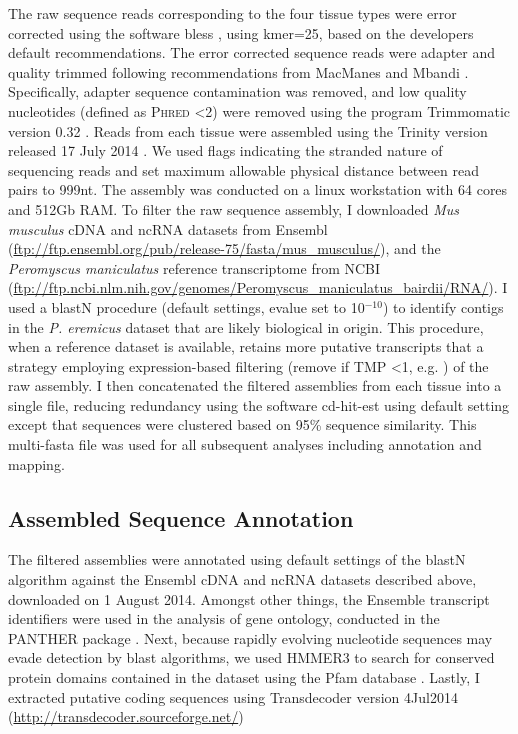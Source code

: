 \documentclass[11pt]{article}
\begin{document}
The raw sequence reads corresponding to the four tissue types were error corrected using the software bless \cite{Heo:2014cb}, using kmer=25, based on the developers default recommendations. The error corrected sequence reads were adapter and quality trimmed following recommendations from MacManes \cite{MacManes:2014io} and Mbandi \cite{Christoffels:2014bg}. Specifically, adapter sequence contamination was removed, and low quality nucleotides (defined as \textsc{Phred} \textless 2) were removed using the program Trimmomatic version 0.32  \cite{Lohse:2012fg}. Reads from each tissue were assembled using the Trinity version released 17 July 2014 \cite{Haas:2013jq}. We used flags indicating the stranded nature of sequencing reads and set maximum allowable physical distance between read pairs to 999nt. The assembly was conducted on a linux workstation with 64 cores and 512Gb RAM. To filter the raw sequence assembly, I downloaded \textit{Mus musculus} cDNA and ncRNA datasets from Ensembl (\url{ftp://ftp.ensembl.org/pub/release-75/fasta/mus_musculus/}), and the \textit{Peromyscus maniculatus} reference transcriptome from NCBI (\url{ftp://ftp.ncbi.nlm.nih.gov/genomes/Peromyscus_maniculatus_bairdii/RNA/}). I used a blastN procedure (default settings, evalue set to 10$^{-10}$) to identify contigs in the \textit{P. eremicus} dataset that are likely biological in origin. This procedure, when a reference dataset is available, retains more putative transcripts that a strategy employing expression-based filtering (remove if TMP \textless 1, e.g. \cite{MacManes:2012bu}) of the raw assembly. I then concatenated the filtered assemblies from each tissue into a single file, reducing redundancy using the software cd-hit-est \cite{Li:2006hr} using default setting except that sequences were clustered based on 95\% sequence similarity. This multi-fasta file was used for all subsequent analyses including annotation and mapping. \\

\subsection*{Assembled Sequence Annotation}



The filtered assemblies were annotated using default settings of the blastN algorithm \cite{Camacho:2009fc} against the Ensembl cDNA and ncRNA datasets described above, downloaded on 1 August 2014. Amongst other things, the Ensemble transcript identifiers were used in the analysis of gene ontology, conducted in the PANTHER package \cite{Mi:2004iv}. Next, because rapidly evolving nucleotide sequences may evade detection by blast algorithms, we used HMMER3 \cite{Wheeler:2013gj} to search for conserved protein domains contained in the dataset using the Pfam database \cite{Punta:2012ko}. Lastly, I extracted putative coding sequences using Transdecoder version 4Jul2014 (\url{http://transdecoder.sourceforge.net/})\\
\end{document}
